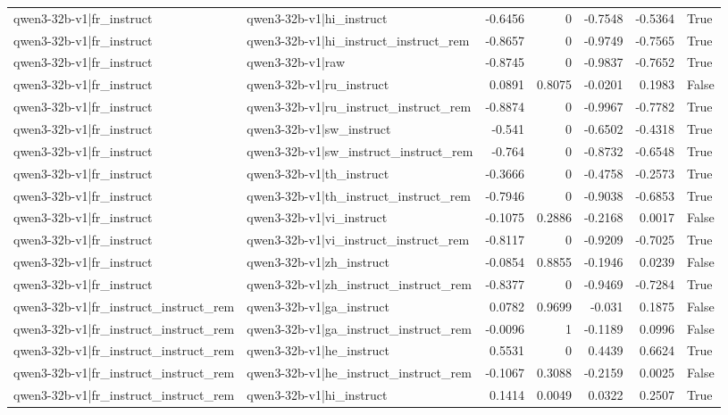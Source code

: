 \begin{table}
\begin{tabular}{l l r r r r l}
qwen3-32b-v1|fr_instruct & qwen3-32b-v1|hi_instruct & -0.6456 & 0 & -0.7548 & -0.5364 & True \\
qwen3-32b-v1|fr_instruct & qwen3-32b-v1|hi_instruct_instruct_rem & -0.8657 & 0 & -0.9749 & -0.7565 & True \\
qwen3-32b-v1|fr_instruct & qwen3-32b-v1|raw & -0.8745 & 0 & -0.9837 & -0.7652 & True \\
qwen3-32b-v1|fr_instruct & qwen3-32b-v1|ru_instruct & 0.0891 & 0.8075 & -0.0201 & 0.1983 & False \\
qwen3-32b-v1|fr_instruct & qwen3-32b-v1|ru_instruct_instruct_rem & -0.8874 & 0 & -0.9967 & -0.7782 & True \\
qwen3-32b-v1|fr_instruct & qwen3-32b-v1|sw_instruct & -0.541 & 0 & -0.6502 & -0.4318 & True \\
qwen3-32b-v1|fr_instruct & qwen3-32b-v1|sw_instruct_instruct_rem & -0.764 & 0 & -0.8732 & -0.6548 & True \\
qwen3-32b-v1|fr_instruct & qwen3-32b-v1|th_instruct & -0.3666 & 0 & -0.4758 & -0.2573 & True \\
qwen3-32b-v1|fr_instruct & qwen3-32b-v1|th_instruct_instruct_rem & -0.7946 & 0 & -0.9038 & -0.6853 & True \\
qwen3-32b-v1|fr_instruct & qwen3-32b-v1|vi_instruct & -0.1075 & 0.2886 & -0.2168 & 0.0017 & False \\
qwen3-32b-v1|fr_instruct & qwen3-32b-v1|vi_instruct_instruct_rem & -0.8117 & 0 & -0.9209 & -0.7025 & True \\
qwen3-32b-v1|fr_instruct & qwen3-32b-v1|zh_instruct & -0.0854 & 0.8855 & -0.1946 & 0.0239 & False \\
qwen3-32b-v1|fr_instruct & qwen3-32b-v1|zh_instruct_instruct_rem & -0.8377 & 0 & -0.9469 & -0.7284 & True \\
qwen3-32b-v1|fr_instruct_instruct_rem & qwen3-32b-v1|ga_instruct & 0.0782 & 0.9699 & -0.031 & 0.1875 & False \\
qwen3-32b-v1|fr_instruct_instruct_rem & qwen3-32b-v1|ga_instruct_instruct_rem & -0.0096 & 1 & -0.1189 & 0.0996 & False \\
qwen3-32b-v1|fr_instruct_instruct_rem & qwen3-32b-v1|he_instruct & 0.5531 & 0 & 0.4439 & 0.6624 & True \\
qwen3-32b-v1|fr_instruct_instruct_rem & qwen3-32b-v1|he_instruct_instruct_rem & -0.1067 & 0.3088 & -0.2159 & 0.0025 & False \\
qwen3-32b-v1|fr_instruct_instruct_rem & qwen3-32b-v1|hi_instruct & 0.1414 & 0.0049 & 0.0322 & 0.2507 & True \\

\end{tabular}
\end{table}
